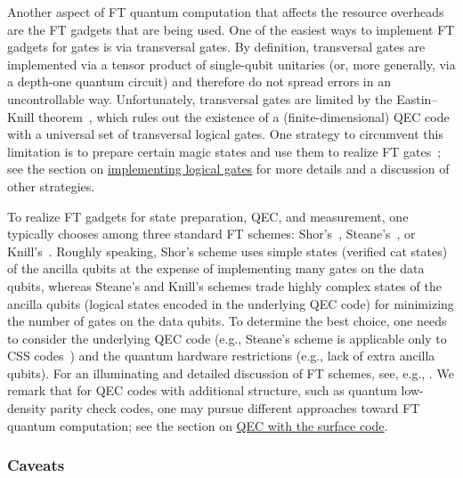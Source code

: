 \begin{refsection}
Another aspect of FT quantum computation that affects the resource overheads are the FT gadgets that are being used.
One of the easiest ways to implement FT gadgets for gates is via transversal gates.
By definition, transversal gates are implemented via a tensor product of single-qubit unitaries (or, more generally, via a depth-one quantum circuit) and therefore do not spread errors in an uncontrollable way.
Unfortunately, transversal gates are limited by the Eastin--Knill theorem~\cite{eastin2009RestrictionsTransversal,zeng2011Transversality,jochymOConnor2018Disjointness,kubica2021QuantumMetrologicalBounds}, which rules out the existence of a (finite-dimensional) QEC code with a universal set of transversal logical gates.
One strategy to circumvent this limitation is to prepare certain magic states and use them to realize FT gates~\cite{bravyi2005UniversalQC}; see the section on \hyperref[prim:LatticeSurgery]{implementing logical gates} for more details and a discussion of other strategies.


To realize FT gadgets for state preparation, QEC, and measurement, one typically chooses among three standard FT schemes: Shor's~\cite{shor1996FTQC}, Steane's~\cite{steane1997ActiveStabilization}, or Knill's~\cite{knill2005QCwithNoisyDevices}.
Roughly speaking, Shor's scheme uses simple states (verified cat states) of the ancilla qubits at the expense of implementing many gates on the data qubits, whereas Steane's and Knill's schemes trade highly complex states of the ancilla qubits (logical states encoded in the underlying QEC code) for minimizing the number of gates on the data qubits. 
To determine the best choice, one needs to consider the underlying QEC code (e.g., Steane's scheme is applicable only to CSS codes~\cite{calderbank1996GoodQECCodes,steane1996ErrorCorrectingQuantum}) and the quantum hardware restrictions (e.g., lack of extra ancilla qubits).
For an illuminating and detailed discussion of FT schemes, see, e.g.,  \cite{gottesman2010introduction}.
We remark that for QEC codes with additional structure, such as quantum low-density parity check codes, one may pursue different approaches toward FT quantum computation; see the section on \hyperref[prim:QEC]{QEC with the surface code}.



\subsubsection*{Caveats}


\end{refsection}
